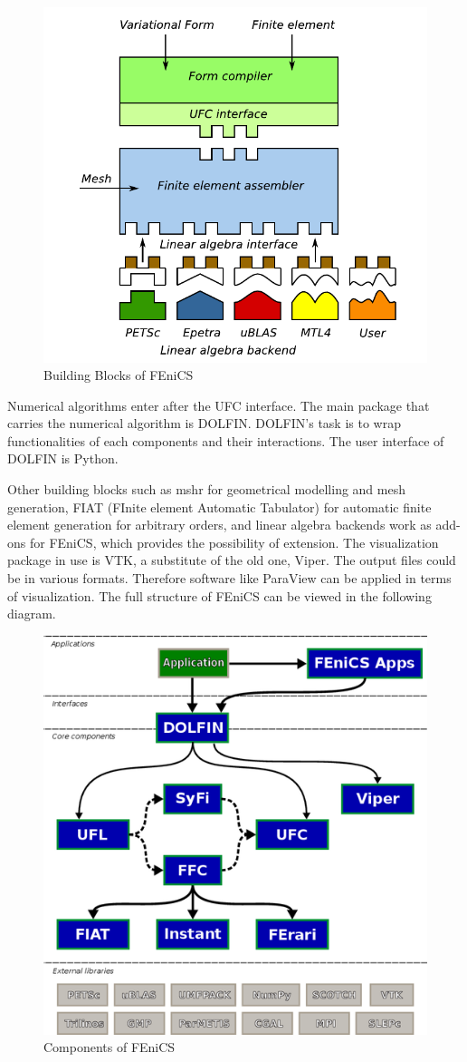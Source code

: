 \documentclass[10pt,a4paper]{scrreprt}
\begin{document}
\begin{figure}[h]
\center
\label{fig: fenics blocks}
\includegraphics[width=0.6\linewidth]{../pics/fenics_building_blocks.png}
\caption{Building Blocks of FEniCS \citep{wells2012automated}}
\end{figure} 

Numerical algorithms enter after the UFC interface. The main package that carries the numerical algorithm is DOLFIN. DOLFIN's task is to wrap functionalities of each components and their interactions. The user interface of DOLFIN is Python.  

Other building blocks such as mshr for geometrical modelling and mesh generation, FIAT (FInite element Automatic Tabulator) for automatic finite element generation for arbitrary orders, and linear algebra backends work as add-ons for FEniCS, which provides the possibility of extension. The visualization package in use is VTK, a substitute of the old one, Viper. The output files could be in various formats. Therefore software like ParaView can be applied in terms of visualization. The full structure of FEniCS can be viewed in the following diagram.

\begin{figure}[h]
\center
\label{fig: fenics map}
\includegraphics[width=0.5\linewidth]{../pics/fenics_map.png}
\caption{Components of FEniCS \citep{wells2012automated}}
\end{figure} 
\end{document}
